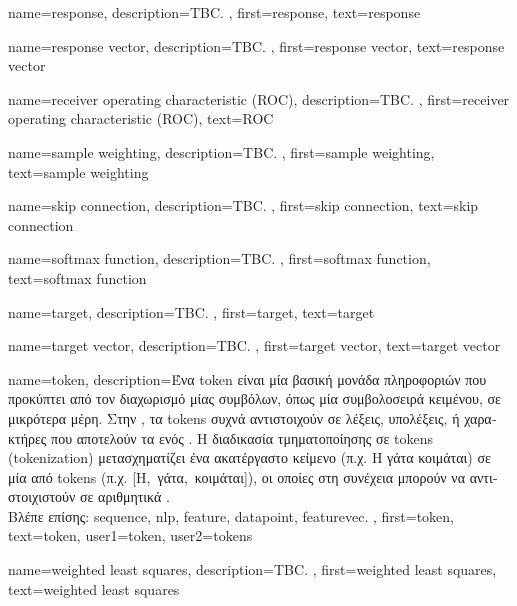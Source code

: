 {name={response},
	description={TBC. },  
 	first={response}, 
 	text={response}
}

{name={response vector},
	description={TBC. },  
 	first={response vector}, 
 	text={response vector}
}

{name={receiver operating characteristic (ROC)}, 
	description={TBC. }, 
  	first={receiver operating characteristic (ROC)}, 
  	text={ROC}
}

{name={sample weighting}, 
	description={TBC. },
	first={sample weighting}, 
	text={sample weighting}
}

{name={skip connection},
	description={TBC. },
 	first={skip connection},
 	text={skip connection}
}

{name={softmax function},
	description={TBC. },
	first={softmax function},
	text={softmax function}
}

{name={target},
	description={TBC. },  
 	first={target}, 
 	text={target}
}

{name={target vector},
	description={TBC. },  
 	first={target vector}, 
 	text={target vector}
}

{name={token},
	description={\foreignlanguage{greek}{Ένα} token 
		\foreignlanguage{greek}{είναι μία βασική μονάδα πληροφοριών που προκύπτει από τον διαχωρισμό μίας}
  		 \foreignlanguage{greek}{συμβόλων, όπως μία συμβολοσειρά κειμένου, σε μικρότερα 
		μέρη. Στην} , \foreignlanguage{greek}{τα} tokens \foreignlanguage{greek}{συχνά αντιστοιχούν σε λέξεις, 
		υπολέξεις, ή χαρακτήρες που αποτελούν τα}  \foreignlanguage{greek}{ενός} . 
  		\foreignlanguage{greek}{Η διαδικασία τμηματοποίησης σε} tokens (tokenization) 
		\foreignlanguage{greek}{μετασχηματίζει ένα ακατέργαστο κείμενο (π.χ. \guillemotleft Η γάτα κοιμάται\guillemotright) σε μία} 
  		 \foreignlanguage{greek}{από} tokens \foreignlanguage{greek}{(π.χ. 
		[\guillemotleft Η\guillemotright,\ \guillemotleft γάτα\guillemotright,\ \guillemotleft κοιμάται\guillemotright]), 
		οι οποίες στη συνέχεια μπορούν να αντιστοιχιστούν σε αριθμητικά} .
		\\ 
		\foreignlanguage{greek}{Βλέπε επίσης:} \gls{sequence}, \gls{nlp}, \gls{feature}, \gls{datapoint}, \gls{featurevec}. }, 
  	first={token},
  	text={token},
	user1={token}, %
	user2={tokens} %
}%

{name={weighted least squares},
	description={TBC. },
	first={weighted least squares},
	text={weighted least squares}
}